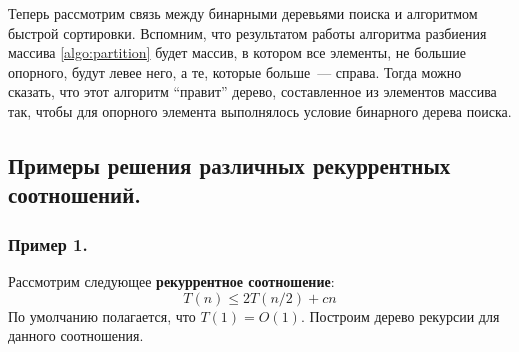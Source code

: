 \documentclass[a4paper,12pt]{article}
\begin{document}
Теперь рассмотрим связь между бинарными деревьями поиска и алгоритмом быстрой сортировки. Вспомним, что результатом работы алгоритма разбиения массива \ref{algo:partition} будет массив, в котором все элементы, не большие опорного, будут левее него, а те, которые больше~--- справа. Тогда можно сказать, что этот алгоритм ``правит'' дерево, составленное из элементов массива так, чтобы для опорного элемента выполнялось условие бинарного дерева поиска. 

\subsection{Примеры решения различных рекуррентных соотношений.}

\subsubsection{Пример 1.}

Рассмотрим следующее \textbf{рекуррентное соотношение}:
\[T(n) \leq 2T(n/2) + cn\]
По умолчанию полагается, что \(T(1) = O(1)\). Построим дерево рекурсии для данного соотношения.
\end{document}
